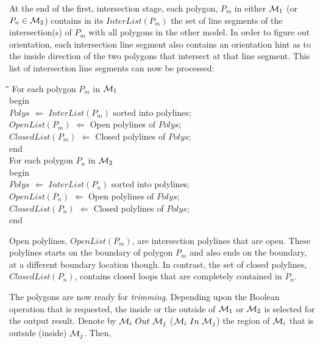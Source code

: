 At the end of the first, intersection stage, each polygon, $P_m$ in
either ${\cal M}_1$ (or $P_n \in {\cal M}_2$) contains in its
$InterList( P_m )$ the set of line segments of the intersection(s) of
$P_m$ with all polygons in the other model.  In order to figure out
orientation, each intersection line segment also contains an
orientation hint as to the inside direction of the two polygons that
intersect at that line segment.  This list of intersection line
segments can now be processed:

\begin{bf}
\begin{tt}
\begin{tabbing}
\hspace{2em}\=\hspace{2em}\=\hspace{2em}\=\hspace{2em}\=\hspace{2em}\=\kill
\> For each polygon $P_m$ in ${\cal M}_1$ \\
\> begin \\
\> \> $Polys$ $\Leftarrow$ $InterList( P_m )$ sorted into polylines; \\
\> \> $OpenList( P_m )$ $\Leftarrow$ Open polylines of $Polys$; \\
\> \> $ClosedList( P_m )$ $\Leftarrow$ Closed polylines of $Polys$; \\
\> end \\
\> For each polygon $P_n$ in ${\cal M}_2$ \\
\> begin \\
\> \> $Polys$ $\Leftarrow$ $InterList( P_n )$ sorted into polylines; \\
\> \> $OpenList( P_n )$ $\Leftarrow$ Open polylines of $Polys$; \\
\> \> $ClosedList( P_n )$ $\Leftarrow$ Closed polylines of $Polys$; \\
\> end \\
\end{tabbing}
\end{tt}
\end{bf}

Open polylines, $OpenList( P_m )$, are intersection polylines that are
open.  These polylines starts on the boundary of polygon $P_m$ and
also ends on the boundary, at a different boundary location though.
In contrast, the set of closed polylines, $ClosedList( P_n )$, contains
closed loops that are completely contained in $P_n$.

The polygons are now ready for {\em trimming}.  Depending upon the Boolean
operation that is requested, the inside or the outside of ${\cal M}_1$ or
${\cal M}_2$ is selected for the output result.  Denote by
${\cal M}_i \ Out \ {\cal M}_j$ (${\cal M}_i \ In \ {\cal M}_j$) the region of
${\cal M}_i$ that is outside (inside) ${\cal M}_j$. Then,

